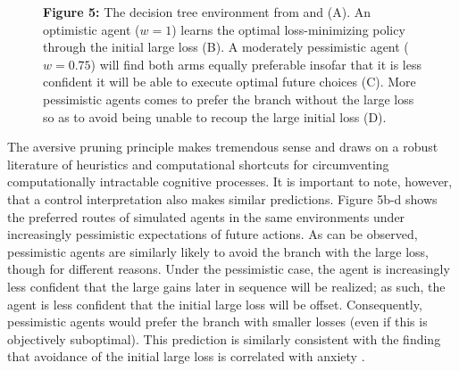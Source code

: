 \documentclass[11pt]{article} %
\begin{document}
\begin{figure}
  \centerline{%
  }
  \par \textbf{Figure 5:} The decision tree environment from \cite{Huys2012} and \cite{Lally2017} (A). An optimistic agent ($w=1$) learns the optimal loss-minimizing policy through the initial large loss (B). A moderately pessimistic agent ($w=0.75$) will find both arms equally preferable insofar that it is less confident it will be able to execute optimal future choices (C). More pessimistic agents comes to prefer the branch without the large loss so as to avoid being unable to recoup the large initial loss (D).
\end{figure}

The aversive pruning principle makes tremendous sense and draws on a robust literature of heuristics and computational shortcuts for circumventing computationally intractable cognitive processes. It is important to note, however, that a control interpretation also makes similar predictions. Figure 5b-d shows the preferred routes of simulated agents in the same environments under increasingly pessimistic expectations of future actions. As can be observed, pessimistic agents are similarly likely to avoid the branch with the large loss, though for different reasons. Under the pessimistic case, the agent is increasingly less confident that the large gains later in sequence will be realized; as such, the agent is less confident that the initial large loss will be offset. Consequently, pessimistic agents would prefer the branch with smaller losses (even if this is objectively suboptimal). This prediction is similarly consistent with the finding that avoidance of the initial large loss is correlated with anxiety \cite{Lally2017}.
\end{document}
